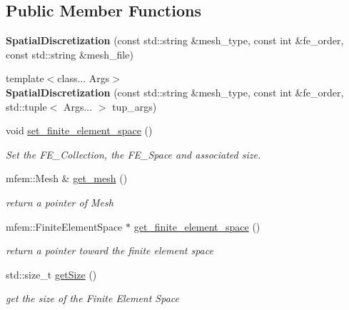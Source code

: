 \subsection*{Public Member Functions}
\begin{DoxyCompactItemize}
\item 
\mbox{\label{classSpatialDiscretization_ac8fffd5a45a9689bb0d8e7a649e9da07}} 
{\bfseries Spatial\+Discretization} (const std\+::string \&mesh\+\_\+type, const int \&fe\+\_\+order, const std\+::string \&mesh\+\_\+file)
\item 
\mbox{\label{classSpatialDiscretization_a8998de1f4f8abfe4ce43135a5a1fc70d}} 
{\footnotesize template$<$class... Args$>$ }\\{\bfseries Spatial\+Discretization} (const std\+::string \&mesh\+\_\+type, const int \&fe\+\_\+order, std\+::tuple$<$ Args... $>$ tup\+\_\+args)
\item 
void \hyperlink{classSpatialDiscretization_a8400a265a094312b4d57708d44f9d627}{set\+\_\+finite\+\_\+element\+\_\+space} ()
\begin{DoxyCompactList}\small\item\em Set the F\+E\+\_\+\+Collection, the F\+E\+\_\+\+Space and associated size. \end{DoxyCompactList}\item 
mfem\+::\+Mesh \& \hyperlink{classSpatialDiscretization_ae83ff765cb60c2805cd2f4c00e85b6b2}{get\+\_\+mesh} ()
\begin{DoxyCompactList}\small\item\em return a pointer of Mesh \end{DoxyCompactList}\item 
mfem\+::\+Finite\+Element\+Space $\ast$ \hyperlink{classSpatialDiscretization_ac001fc2ff356fe8c0c2b49618e594a03}{get\+\_\+finite\+\_\+element\+\_\+space} ()
\begin{DoxyCompactList}\small\item\em return a pointer toward the finite element space \end{DoxyCompactList}\item 
std\+::size\+\_\+t \hyperlink{classSpatialDiscretization_a2f23ae965741d678ef45c6a545ce9a9d}{get\+Size} ()
\begin{DoxyCompactList}\small\item\em get the size of the Finite Element Space \end{DoxyCompactList}\item 

\end{DoxyCompactItemize}
